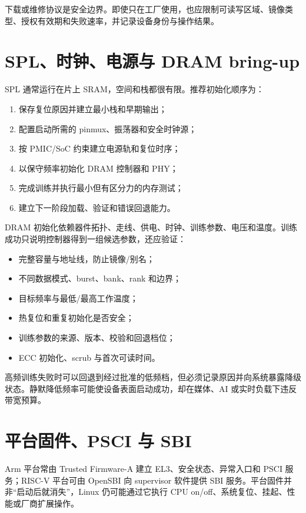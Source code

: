 下载或维修协议是安全边界。即使只在工厂使用，也应限制可读写区域、镜像类型、授权有效期和失败速率，并记录设备身份与操作结果。

\section{SPL、时钟、电源与 DRAM bring-up}

SPL 通常运行在片上 SRAM，空间和栈都很有限。推荐初始化顺序为：

\begin{enumerate}
  \item 保存复位原因并建立最小栈和早期输出；
  \item 配置启动所需的 pinmux、振荡器和安全时钟源；
  \item 按 PMIC/SoC 约束建立电源轨和复位时序；
  \item 以保守频率初始化 DRAM 控制器和 PHY；
  \item 完成训练并执行最小但有区分力的内存测试；
  \item 建立下一阶段加载、验证和错误回退能力。
\end{enumerate}

DRAM 初始化依赖器件拓扑、走线、供电、时钟、训练参数、电压和温度。训练成功只说明控制器得到一组候选参数，还应验证：

\begin{itemize}
  \item 完整容量与地址线，防止镜像/别名；
  \item 不同数据模式、burst、bank、rank 和边界；
  \item 目标频率与最低/最高工作温度；
  \item 热复位和重复初始化是否安全；
  \item 训练参数的来源、版本、校验和回退档位；
  \item ECC 初始化、scrub 与首次可读时间。
\end{itemize}

高频训练失败时可以回退到经过批准的低频档，但必须记录原因并向系统暴露降级状态。静默降低频率可能使设备表面启动成功，却在媒体、AI 或实时负载下违反带宽预算。

\section{平台固件、PSCI 与 SBI}

Arm 平台常由 Trusted Firmware-A 建立 EL3、安全状态、异常入口和 PSCI 服务；RISC-V 平台可由 OpenSBI 向 supervisor 软件提供 SBI 服务\cite{trusted-firmware-a-doc,riscv-sbi}。平台固件并非“启动后就消失”，Linux 仍可能通过它执行 CPU on/off、系统复位、挂起、性能或厂商扩展操作。

